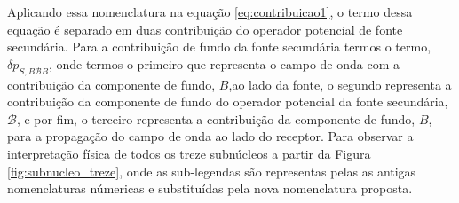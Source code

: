 Aplicando essa nomenclatura na equação \ref{eq:contribuicao1}, o termo dessa equação é separado em duas contribuição do operador potencial de fonte secundária. Para a contribuição de fundo da fonte secundária termos o termo, $\delta p_{S,B\mathcal{B}B}$, onde termos o primeiro que representa o campo de onda com a contribuição da componente de fundo, $B$,ao lado da fonte, o segundo representa a contribuição da componente de fundo do operador potencial da fonte secundária,  $\mathcal{B}$, e por fim, o terceiro representa a contribuição da componente de fundo, $B$, para a propagação do campo de onda ao lado do receptor. Para observar a interpretação física de todos os treze subnúcleos a partir da Figura \ref{fig:subnucleo_treze}, onde as sub-legendas são representas pelas as antigas nomenclaturas númericas e substituídas pela nova nomenclatura proposta.  \\

